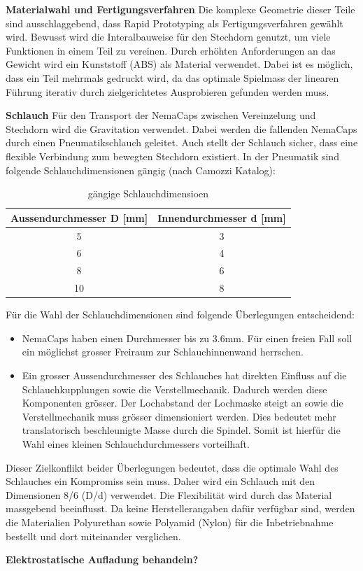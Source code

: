 \textbf{Materialwahl und Fertigungsverfahren}
\newline
Die komplexe Geometrie dieser Teile sind ausschlaggebend, dass Rapid Prototyping als Fertigungsverfahren gewählt wird. Bewusst wird die Interalbauweise für den Stechdorn genutzt, um viele Funktionen in einem Teil zu vereinen. Durch erhöhten Anforderungen an das Gewicht wird ein Kunststoff (ABS) als Material verwendet. Dabei ist es möglich, dass ein Teil mehrmals gedruckt wird, da das optimale Spielmass der linearen Führung iterativ durch zielgerichtetes Ausprobieren gefunden werden muss. 
\newline

\textbf{Schlauch}
\newline
Für den Transport der NemaCaps zwischen Vereinzelung und Stechdorn wird die Gravitation verwendet. Dabei werden die fallenden NemaCaps durch einen Pneumatikschlauch geleitet. Auch stellt der Schlauch sicher, dass eine flexible Verbindung zum bewegten Stechdorn existiert. In der Pneumatik sind folgende Schlauchdimensionen gängig (nach Camozzi Katalog):
\newline
\begin{table}[H]
\begin{tabular}{|c|c|}
	\hline 
	Aussendurchmesser D [mm] & Innendurchmesser d [mm] \\ 
	\hline 
	5 & 3 \\ 
	\hline 
	6 & 4  \\ 
	\hline 
	8 & 6 \\ 
	\hline 
	10 & 8  \\ 
	\hline 
\end{tabular}
	\caption{gängige Schlauchdimensioen}
	\label{tab:Schlauchdimensioen}
\end{table}

Für die Wahl der Schlauchdimensionen sind folgende Überlegungen entscheidend:
\begin{itemize}
	\item NemaCaps haben einen Durchmesser bis zu 3.6mm. Für einen freien Fall soll ein möglichst grosser Freiraum zur Schlauchinnenwand herrschen.
	
	\item Ein grosser Aussendurchmesser des Schlauches hat direkten Einfluss auf die Schlauchkupplungen sowie die Verstellmechanik. Dadurch werden diese Komponenten grösser. Der Lochabstand der Lochmaske steigt an sowie die Verstellmechanik muss grösser dimensioniert werden. Dies bedeutet mehr translatorisch beschleunigte Masse durch die Spindel. Somit ist hierfür die Wahl eines kleinen Schlauchdurchmessers vorteilhaft.
\end{itemize}
Dieser Zielkonflikt beider Überlegungen bedeutet, dass die optimale Wahl des Schlauches ein Kompromiss sein muss. Daher wird ein Schlauch mit den Dimensionen 8/6 (D/d) verwendet.
\newline
Die Flexibilität wird durch das Material massgebend beeinflusst. Da keine Herstellerangaben dafür verfügbar sind, werden die Materialien Polyurethan sowie Polyamid (Nylon) für die Inbetriebnahme bestellt und dort miteinander verglichen.

\textbf{Elektrostatische Aufladung behandeln?}